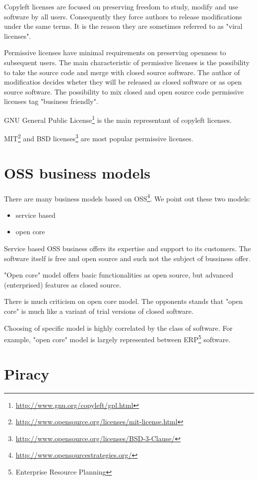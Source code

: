 \documentclass[times, utf8, seminar]{fit}
\begin{document}
Copyleft licenses are focused on preserving freedom to study, modify and use software by all users. Consequently they force authors to release modifications under the same terms. It is the reason they are sometimes referred to as "viral licenses".

Permissive licenses have minimal requirements on preserving openness to subsequent users. The main characteristic of permissive licenses is the possibility to take the source code and merge with closed source software. The author of modificatios decides wheter they will be released as closed software or as open source software. The possibility to mix closed and open source code permissive licenses tag "business friendly".

GNU General Public License\footnote{\url{http://www.gnu.org/copyleft/gpl.html}} is the main representant of copyleft licenses.

MIT\footnote{\url{http://www.opensource.org/licenses/mit-license.html}} and BSD licenses\footnote{\url{http://www.opensource.org/licenses/BSD-3-Clause/}} are most popular permissive licenses.

\section{OSS business models}

There are many business models based on OSS\footnote{\url{http://www.opensourcestrategies.org/}}. We point out these two models: 
\begin{itemize}
  \item service based
  \item open core 
\end{itemize}


Service based OSS business offers its expertise and support to its customers. The software itself is free and open source and such not the subject of bussiness offer.

"Open core" model offers basic functionalities as open source, but advanced (enterprised) features as closed source.

There is much criticism on open core model. The opponents stands that "open core" is much like a variant of trial versions of closed software.

Choosing of specific model is highly correlated by the class of software.  For example, "open core" model is largely represented between ERP\footnote{Enterprise Resource Planning} software.  

\section{Piracy}
\end{document}
